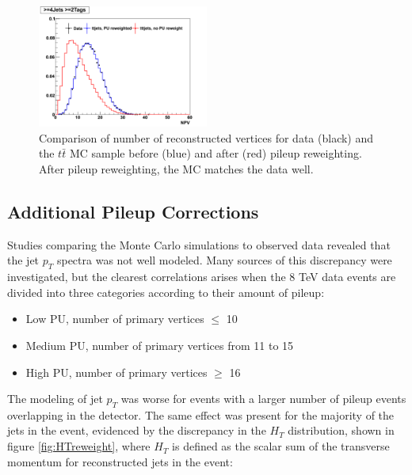 \begin{figure}[hbtp]
 \begin{center}
   \includegraphics[width=0.5\textwidth]{Figures/Analysis_1_Diagrams/pileUpReWeighting_4Jincl2Tincl.pdf}
   \caption{Comparison of number of reconstructed vertices for data
     (black) and the $t\bar{t}$ MC sample before (blue) and after
     (red) pileup reweighting.  After pileup reweighting, the MC
     matches the data well.} \label{fig:PUrewgt}
 \end{center}
\end{figure}


\subsection{Additional Pileup Corrections}
\label{additional_pileup_reweight_overview}

\par Studies comparing the Monte Carlo simulations to observed
data revealed that the jet $p_T$ spectra was not well modeled.  Many
sources of this discrepancy were investigated, but the clearest
correlations arises when the 8 TeV data events are divided into three
categories according to their amount of pileup:

\begin{itemize}
\item Low PU, number of primary vertices $\leq$ 10
\item Medium PU, number of primary vertices from 11 to 15
\item High PU, number of primary vertices $\geq$ 16
\end{itemize}

\noindent  The modeling of jet $p_{T}$ was worse for events with a
larger number of pileup events overlapping in the detector. The same
effect was present for the majority of the jets in the event,
evidenced by the discrepancy in the $H_{T}$ distribution, shown in
figure \ref{fig:HTreweight}, where $H_{T}$ is defined as the scalar
sum of the transverse momentum for reconstructed jets in the event:

